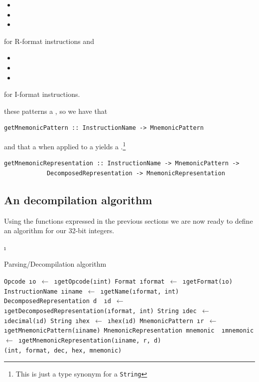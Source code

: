 \begin{itemize}
\item {}
\item {}
\item {}
\end{itemize}

for R-format instructions and

\begin{itemize}
\item {}
\item {}
\item {}
\end{itemize}

for I-format instructions.

these patterns a , so we have that

\begin{verbatim}
getMnemonicPattern :: InstructionName -> MnemonicPattern
\end{verbatim}

and that a  when applied to a \decomposedm
yields a .\footnote{This is just a type synonym for a \texttt{String}}

\begin{verbatim}
getMnemonicRepresentation :: InstructionName -> MnemonicPattern -> 
            DecomposedRepresentation -> MnemonicRepresentation
\end{verbatim}

\subsection{An decompilation algorithm}

Using the functions expressed in the previous sections we are now ready to
define an algorithm for our 32-bit integers.

\LetLtxMacro\i\textit
\newcommand{\get}[2]{\tt{#1} \i{#2} $\gets$ }
\newcommand{\of}[1]{(\i{#1})}
\newcommand{\from}[1]{\i{#1}}

\begin{algorithm}
\caption{Parsing/Decompilation algorithm}\label{algo:decompile}
\begin{algorithmic}[1]
\State \get{Opcode}{o}\from{getOpcode}\of{int}
\State \get{Format}{format}\from{getFormat}\of{o}
\State \get{InstructionName}{iname}\from{getName}\of{format, int}
\State \tt{DecomposedRepresentation} d
\State \get{}{d}\from{getDecomposedRepresentation}\of{format, int}
\State \get{String}{dec}\from{decimal}\of{d}
\State \get{String}{hex}\from{hex}\of{d}
\State \get{MnemonicPattern}{r}\from{getMnemonicPattern}\of{iname}
\State \tt{MnemonicRepresentation} mnemonic
\State \get{}{mnemonic}\from{getMnemonicRepresentation}\of{iname, r, d} \\
\Return (int, format, dec, hex, mnemonic)
\EndProcedure
\end{algorithmic}
\end{algorithm}



